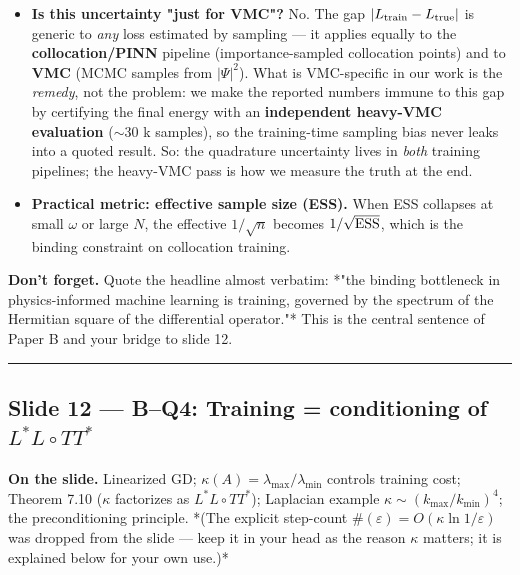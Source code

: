\documentclass[11pt]{article}
\begin{document}
\begin{itemize}
measure of the parameter set*: the number of small balls of radius
$\delta$ needed to cover $\Theta$. It enters because the $\sup_\theta$ is
controlled by a union bound over a finite $\delta$-net of $\Theta$ ---
$\log \mathcal N$ is, loosely, "effective number of parameters $\times
  \log(1/\delta)$." A bigger / more flexible network $\Rightarrow$ larger
$\mathcal N$ $\Rightarrow$ you need more samples $n$ to make the train-vs-true
gap small. It is \emph{not} anything quantum or VMC-specific; it is the
classical statistical-learning capacity term.
\item \textbf{Is this uncertainty "just for VMC"?} No. The gap $|L_{\rm train} -
  L_{\rm true}|$ is generic to \emph{any} loss estimated by sampling --- it applies
equally to the \textbf{collocation/PINN} pipeline (importance-sampled
collocation points) and to \textbf{VMC} (MCMC samples from $|\Psi|^2$). What is
VMC-specific in our work is the \emph{remedy}, not the problem: we make the
reported numbers immune to this gap by certifying the final energy with an
\textbf{independent heavy-VMC evaluation} ($\sim$30 k samples), so the
training-time sampling bias never leaks into a quoted result. So: the
quadrature uncertainty lives in \emph{both} training pipelines; the heavy-VMC
pass is how we measure the truth at the end.
\item \textbf{Practical metric: effective sample size (ESS).} When ESS collapses at
small $\omega$ or large $N$, the effective $1/\sqrt n$ becomes $1/\sqrt{\rm
  ESS}$, which is the binding constraint on collocation training.
\end{itemize}
\textbf{Don't forget.} Quote the headline almost verbatim: *"the binding
bottleneck in physics-informed machine learning is training, governed by
the spectrum of the Hermitian square of the differential operator."* This
is the central sentence of Paper B and your bridge to slide 12.

\vspace{4pt}\hrule\vspace{8pt}

\subsection*{Slide 12 --- B--Q4: Training = conditioning of $L^* L \circ TT^*$}

\textbf{On the slide.} Linearized GD; $\kappa(A)=\lambda_{\max}/\lambda_{\min}$
controls training cost; Theorem 7.10 ($\kappa$ factorizes as $L^*L \circ
TT^*$); Laplacian example $\kappa \sim (k_{\max}/k_{\min})^4$; the
preconditioning principle. *(The explicit step-count $\#(\varepsilon) =
O(\kappa\ln 1/\varepsilon)$ was dropped from the slide --- keep it in your head
as the reason $\kappa$ matters; it is explained below for your own use.)*
\end{document}
